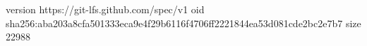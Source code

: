 version https://git-lfs.github.com/spec/v1
oid sha256:aba203a8cfa501333eca9e4f29b6116f4706ff2221844ea53d081cde2bc2e7b7
size 22988
